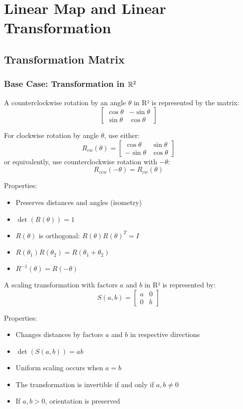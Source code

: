 \chapter{Linear Map and Linear Transformation}


\section{Transformation Matrix}
\subsection{Base Case: Transformation in $\mathbb{R}^2$}
\begin{definition}
A counterclockwise rotation by an angle $\theta$ in R² is represented by the matrix:
$$\begin{bmatrix}
\cos \theta & -\sin \theta \\
\sin \theta & \cos \theta
\end{bmatrix}$$

For clockwise rotation by angle $\theta$, use either:
$$R_{cw}(\theta) = \begin{bmatrix} 
\cos \theta & \sin \theta \\
-\sin \theta & \cos \theta
\end{bmatrix}$$
or equivalently, use counterclockwise rotation with $-\theta$:
$$R_{ccw}(-\theta) = R_{cw}(\theta)$$

Properties:
\begin{itemize}
    \item Preserves distances and angles (isometry)
    \item $\det(R(\theta)) = 1$
    \item $R(\theta)$ is orthogonal: $R(\theta)R(\theta)^T = I$
    \item $R(\theta_1)R(\theta_2) = R(\theta_1 + \theta_2)$
    \item $R^{-1}(\theta) = R(-\theta)$
\end{itemize}
\end{definition}

\begin{definition}
A scaling transformation with factors $a$ and $b$ in R² is represented by:
$$S(a,b) = \begin{bmatrix}
a & 0 \\
0 & b
\end{bmatrix}$$

Properties:
\begin{itemize}
    \item Changes distances by factors $a$ and $b$ in respective directions
    \item $\det(S(a,b)) = ab$
    \item Uniform scaling occurs when $a = b$
    \item The transformation is invertible if and only if $a, b \neq 0$
    \item If $a, b > 0$, orientation is preserved
\end{itemize}
\end{definition}

